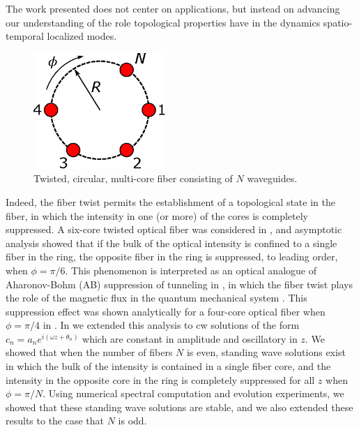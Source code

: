 \documentclass[11pt,reqno]{amsart}
\begin{document}
The work presented does not center on applications, but instead on advancing our understanding of the role topological properties have in the dynamics spatio-temporal localized modes. 

\begin{figure}
\begin{center}
\includegraphics[width=5cm]{circle}
\end{center}
\caption{Twisted, circular, multi-core fiber consisting of $N$ waveguides.}
\label{fig:circle}
\end{figure}
 Indeed, the fiber twist permits the establishment of a topological state in the fiber, in which the intensity in one (or more) of the cores is completely suppressed. A six-core twisted optical fiber was considered in \cite{castro2016}, and asymptotic analysis showed that if the bulk of the optical intensity is confined to a single fiber in the ring, the opposite fiber in the ring is suppressed, to leading order, when $\phi = \pi/6$. This phenomenon is interpreted as an optical analogue of Aharonov-Bohm (AB) suppression of tunneling in \cite{Ornigotti2007,Parto2017,Parto2019}, in which the fiber twist plays the role of the magnetic flux in the quantum mechanical system \cite{Loss1992}. This suppression effect was shown analytically for a four-core optical fiber when $\phi=\pi/4$ in \cite{Parto2019}. In \cite{parker2021} we extended this analysis to cw solutions of the form $c_n = a_n e^{i (\omega z + \theta_n) }$ which are constant in amplitude and oscillatory in $z$. We showed that when the number of fibers $N$ is even, standing wave solutions exist in which the bulk of the intensity is contained in a single fiber core, and the intensity in the opposite core in the ring is completely suppressed for all $z$ when $\phi = \pi/N$. Using numerical spectral computation and evolution experiments, we showed that these standing wave solutions are stable, and we also extended these results to the case that $N$ is odd.
\end{document}
